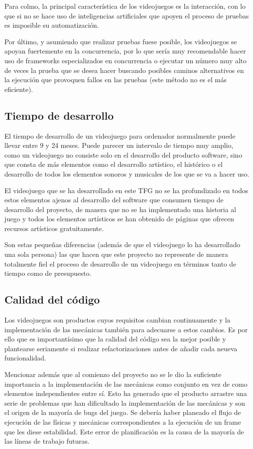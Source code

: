 Para colmo, la principal característica de los videojuegos es la interacción, con lo que si no se hace uso de inteligencias artificiales que apoyen el proceso de pruebas es imposible su automatización.

Por último, y asumiendo que realizar pruebas fuese posible, los videojuegos se apoyan fuertemente en la concurrencia, por lo que sería muy recomendable hacer uso de frameworks especializados en concurrencia o ejecutar un número muy alto de veces la prueba que se desea hacer buscando posibles caminos alternativos en la ejecución que provoquen fallos en las pruebas (este método no es el más eficiente).

\subsection{Tiempo de desarrollo}
El tiempo de desarrollo de un videojuego para ordenador normalmente puede llevar entre 9 y 24 meses. Puede parecer un intervalo de tiempo muy amplio, como un videojuego no consiste solo en el desarrollo del producto software, sino que consta de más elementos como el desarrollo artístico, el histórico o el desarrollo de todos los elementos sonoros y musicales de los que se va a hacer uso.

El videojuego que se ha desarrollado en este TFG no se ha profundizado en todos estos elementos ajenos al desarrollo del software que consumen tiempo de desarrollo del proyecto, de manera que no se ha implementado una historia al juego y todos los elementos artísticos se han obtenido de páginas que ofrecen recursos artísticos gratuitamente.

Son estas pequeñas diferencias (además de que el videojuego lo ha desarrollado una sola persona) las que hacen que este proyecto no represente de manera totalmente fiel el proceso de desarrollo de un videojuego en términos tanto de tiempo como de presupuesto.

\subsection{Calidad del código}
Los videojuegos son productos cuyos requisitos cambian continuamente y la implementación de las mecánicas también para adecuarse a estos cambios. Es por ello que es importantísimo que la calidad del código sea la mejor posible y plantearse seriamente si realizar refactorizaciones antes de añadir cada neueva funcionalidad.

Mencionar además que al comienzo del proyecto no se le dio la suficiente importancia a la implementación de las mecánicas como conjunto en vez de como elementos independientes entre sí. Esto ha generado que el producto arrastre una serie de problemas que han dificultado la implementación de las mecánicas y son el origen de la mayoría de bugs del juego.
Se debería haber planeado el flujo de ejecución de las físicas y mecánicas correspondientes a la ejecución de un frame que les diese estabilidad. Este error de planificación es la causa de la mayoría de las líneas de trabajo futuras.

